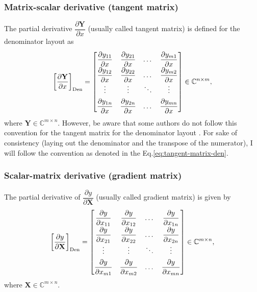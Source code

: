 \documentclass{article}
\begin{document}
\subsubsection{Matrix-scalar derivative (tangent matrix)}
The partial derivative \(\dfrac{\partial \mathbf{Y}}{\partial x}\) (usually called tangent matrix) is defined for the denominator layout as
\begin{align}
    \label{eq:tangent-matrix-den}
    \left[\dfrac{\partial \mathbf{Y}}{\partial x}\right]_{\textnormal{Den}} \renewcommand{\arraystretch}{1.8} = \begin{bmatrix}
        \dfrac{\partial y_{11}}{\partial x} & \dfrac{\partial y_{21}}{\partial x} & \dots & \dfrac{\partial y_{m1}}{\partial x} \\
        \dfrac{\partial y_{12}}{\partial x} & \dfrac{\partial y_{22}}{\partial x} & \dots & \dfrac{\partial y_{m2}}{\partial x} \\
        \vdots & \vdots & \ddots & \vdots \\
        \dfrac{\partial y_{1n}}{\partial x} & \dfrac{\partial y_{2n}}{\partial x} & \dots & \dfrac{\partial y_{mn}}{\partial x} \\
    \end{bmatrix} \in \mathbb{C}^{n \times m},
\end{align}
where \(\mathbf{Y} \in \mathbb{C}^{m \times n}\). However, be aware that some authors do not follow this convention for the tangent matrix for the denominator layout \cite{Matrixca44:online}. For sake of consistency (laying out the denominator and the transpose of the numerator), I will follow the convention as denoted in the Eq.\eqref{eq:tangent-matrix-den}.

\subsubsection{Scalar-matrix derivative (gradient matrix)}
The partial derivative of \(\dfrac{\partial y}{\partial \mathbf{X}}\) (usually called gradient matrix) is given by
\begin{align}
    \label{eq:gradient-matrix-den}
    \renewcommand{\arraystretch}{1.8}
			\left[\dfrac{\partial y}{\partial \mathbf{X}}\right]_{\textnormal{Den}} = \begin{bmatrix}
				\dfrac{\partial y}{\partial x_{11}} & \dfrac{\partial y}{\partial x_{12}} & \dots & \dfrac{\partial y}{\partial x_{1n}} \\
				\dfrac{\partial y}{\partial x_{21}} & \dfrac{\partial y}{\partial x_{22}} & \dots & \dfrac{\partial y}{\partial x_{2n}} \\
				\vdots & \vdots & \ddots & \vdots \\
				\dfrac{\partial y}{\partial x_{m1}} & \dfrac{\partial y}{\partial x_{m2}} & \dots & \dfrac{\partial y}{\partial x_{mn}} \\
			\end{bmatrix} \in \mathbb{C}^{m \times n},
\end{align}
where \(\mathbf{X} \in \mathbb{C}^{m \times n}\).
\end{document}
